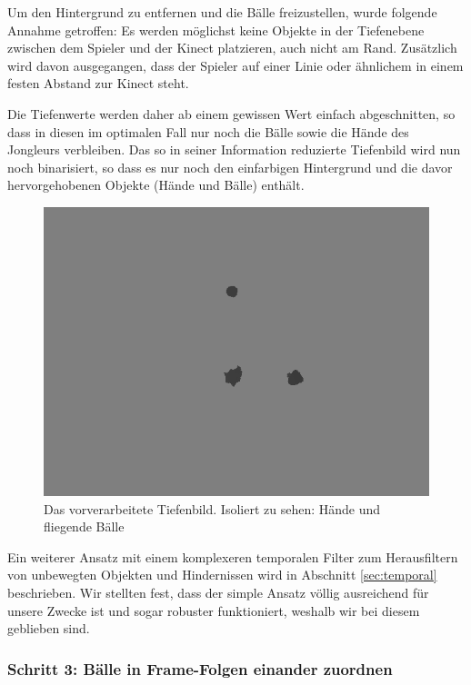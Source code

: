 \documentclass[12pt,a4paper,ngerman]{scrartcl}
\begin{document}
Um den Hintergrund zu entfernen und die Bälle freizustellen, wurde folgende Annahme getroffen: Es werden möglichst keine Objekte in der Tiefenebene zwischen dem Spieler und der Kinect platzieren, auch nicht am Rand. Zusätzlich wird davon ausgegangen, dass der Spieler auf einer Linie oder ähnlichem in einem festen Abstand zur Kinect steht.

Die Tiefenwerte werden daher ab einem gewissen Wert einfach abgeschnitten, so dass in diesen im optimalen Fall nur noch die Bälle sowie die Hände des
Jongleurs verbleiben. Das so in seiner Information reduzierte Tiefenbild wird nun noch binarisiert, so dass
es nur noch den einfarbigen Hintergrund und die davor hervorgehobenen Objekte (Hände und Bälle) enthält.



\begin{figure}[H]
    \centering
    \includegraphics[scale=0.6]{img/depth-binary.png}
    \vspace{-0.5cm}
    \caption{Das vorverarbeitete Tiefenbild. Isoliert zu sehen: Hände und fliegende Bälle}
    \label{rects-3}
\end{figure}


Ein weiterer Ansatz mit einem komplexeren temporalen Filter zum Herausfiltern von unbewegten Objekten und
Hindernissen wird in Abschnitt \ref{sec:temporal} beschrieben. Wir stellten fest, dass der simple Ansatz
völlig ausreichend für unsere Zwecke ist und sogar robuster funktioniert, weshalb wir bei diesem geblieben
sind.

\subsubsection{Schritt 3: Bälle in Frame-Folgen einander zuordnen}
\label{sec:ballzuordnung}
\end{document}
